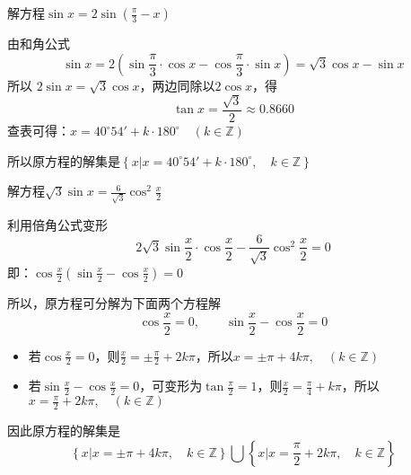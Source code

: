 \begin{example}
    解方程$\sin x=2\sin\left(\frac{\pi}{3}-x\right)$
\end{example}

\begin{solution}
    由和角公式$$\sin x=2\left(\sin\frac{\pi}{3}\cdot \cos x-\cos\frac{\pi}{3}\cdot \sin x\right)=\sqrt{3}\cos x-\sin x$$
所以 $2\sin x=\sqrt{3}\cos x$，两边同除以$2\cos x$，得
\[\tan x=\frac{\sqrt{3}}{2}\approx 0.8660\]
查表可得：$x=40^{\circ}54'+k\cdot 180^{\circ}\quad (k\in\mathbb{Z})$

所以原方程的解集是$\left\{x \Big|x=40^{\circ}54'+k\cdot 180^{\circ},\quad k\in\mathbb{Z}\right\}$
\end{solution}


\begin{example}
    解方程$\sqrt{3}\sin x=\frac{6}{\sqrt{3}}\cos^2\frac{x}{2}$
\end{example}

\begin{solution}
利用倍角公式变形
\[2\sqrt{3}\sin\frac{x}{2}\cdot \cos\frac{x}{2}-\frac{6}{\sqrt{3}}\cos^2\frac{x}{2}=0  \]
即：$\cos\frac{x}{2}\left(\sin\frac{x}{2}- \cos\frac{x}{2}\right)=0$

所以，原方程可分解为下面两个方程解
\[\cos\frac{x}{2}=0,\qquad \sin\frac{x}{2}-\cos\frac{x}{2}=0\]
\begin{itemize}
    \item 若$\cos\frac{x}{2}=0$，则$\frac{x}{2}=\pm\frac{\pi}{2}+2k\pi$，所以$x=\pm \pi+4k\pi,\quad (k\in\mathbb{Z})$
    \item 若$\sin\frac{x}{2}-\cos\frac{x}{2}=0$，可变形为$\tan\frac{\pi}{2}=1$，则$\frac{x}{2}=\frac{\pi}{4}+k\pi$，所以$x=\frac{\pi}{2}+2k\pi,\quad (k\in\mathbb{Z})$
\end{itemize}
因此原方程的解集是
\[\left\{x \Big|x=\pm \pi+4k\pi,\quad k\in\mathbb{Z}\right\}\bigcup \left\{x \Big|x=\frac{\pi}{2}+2k\pi,\quad k\in\mathbb{Z}\right\}\]
\end{solution}



